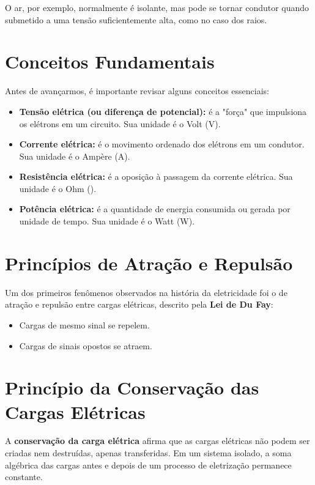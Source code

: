 O ar, por exemplo, normalmente é isolante, mas pode se tornar condutor quando submetido a uma tensão suficientemente alta, como no caso dos raios.

\section{Conceitos Fundamentais}
Antes de avançarmos, é importante revisar alguns conceitos essenciais:

\begin{itemize}
    \item \textbf{Tensão elétrica (ou diferença de potencial):} é a "força" que impulsiona os elétrons em um circuito. Sua unidade é o Volt (V).
    
    \item \textbf{Corrente elétrica:} é o movimento ordenado dos elétrons em um condutor. Sua unidade é o Ampère (A).
    
    \item \textbf{Resistência elétrica:} é a oposição à passagem da corrente elétrica. Sua unidade é o Ohm (\Omega).
    
    \item \textbf{Potência elétrica:} é a quantidade de energia consumida ou gerada por unidade de tempo. Sua unidade é o Watt (W).
\end{itemize}

\section{Princípios de Atração e Repulsão}
Um dos primeiros fenômenos observados na história da eletricidade foi o de atração e repulsão entre cargas elétricas, descrito pela \textbf{Lei de Du Fay}:

\begin{itemize}
    \item Cargas de mesmo sinal se repelem.
    \item Cargas de sinais opostos se atraem.
\end{itemize}

\section{Princípio da Conservação das Cargas Elétricas}
A \textbf{conservação da carga elétrica} afirma que as cargas elétricas não podem ser criadas nem destruídas, apenas transferidas. Em um sistema isolado, a soma algébrica das cargas antes e depois de um processo de eletrização permanece constante.


